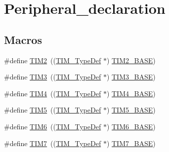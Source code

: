 \hypertarget{group___peripheral__declaration}{}\section{Peripheral\+\_\+declaration}
\label{group___peripheral__declaration}
\subsection*{Macros}
\begin{DoxyCompactItemize}
\item 
\#define \mbox{\hyperlink{group___peripheral__declaration_ga3cfac9f2e43673f790f8668d48b4b92b}{T\+I\+M2}}~((\mbox{\hyperlink{struct_t_i_m___type_def}{T\+I\+M\+\_\+\+Type\+Def}} $\ast$) \mbox{\hyperlink{group___peripheral__memory__map_ga00d0fe6ad532ab32f0f81cafca8d3aa5}{T\+I\+M2\+\_\+\+B\+A\+SE}})
\item 
\#define \mbox{\hyperlink{group___peripheral__declaration_ga61ee4c391385607d7af432b63905fcc9}{T\+I\+M3}}~((\mbox{\hyperlink{struct_t_i_m___type_def}{T\+I\+M\+\_\+\+Type\+Def}} $\ast$) \mbox{\hyperlink{group___peripheral__memory__map_gaf0c34a518f87e1e505cd2332e989564a}{T\+I\+M3\+\_\+\+B\+A\+SE}})
\item 
\#define \mbox{\hyperlink{group___peripheral__declaration_ga91a09bad8bdc7a1cb3d85cf49c94c8ec}{T\+I\+M4}}~((\mbox{\hyperlink{struct_t_i_m___type_def}{T\+I\+M\+\_\+\+Type\+Def}} $\ast$) \mbox{\hyperlink{group___peripheral__memory__map_ga56e2d44b0002f316527b8913866a370d}{T\+I\+M4\+\_\+\+B\+A\+SE}})
\item 
\#define \mbox{\hyperlink{group___peripheral__declaration_ga5125ff6a23a2ed66e2e19bd196128c14}{T\+I\+M5}}~((\mbox{\hyperlink{struct_t_i_m___type_def}{T\+I\+M\+\_\+\+Type\+Def}} $\ast$) \mbox{\hyperlink{group___peripheral__memory__map_ga3e1671477190d065ba7c944558336d7e}{T\+I\+M5\+\_\+\+B\+A\+SE}})
\item 
\#define \mbox{\hyperlink{group___peripheral__declaration_gac7b4ed55f9201b498b38c962cca97314}{T\+I\+M6}}~((\mbox{\hyperlink{struct_t_i_m___type_def}{T\+I\+M\+\_\+\+Type\+Def}} $\ast$) \mbox{\hyperlink{group___peripheral__memory__map_ga8268ec947929f192559f28c6bf7d1eac}{T\+I\+M6\+\_\+\+B\+A\+SE}})
\item 
\#define \mbox{\hyperlink{group___peripheral__declaration_ga49267c49946fd61db6af8b49bcf16394}{T\+I\+M7}}~((\mbox{\hyperlink{struct_t_i_m___type_def}{T\+I\+M\+\_\+\+Type\+Def}} $\ast$) \mbox{\hyperlink{group___peripheral__memory__map_ga0ebf54364c6a2be6eb19ded6b18b6387}{T\+I\+M7\+\_\+\+B\+A\+SE}})

\end{DoxyCompactItemize}
